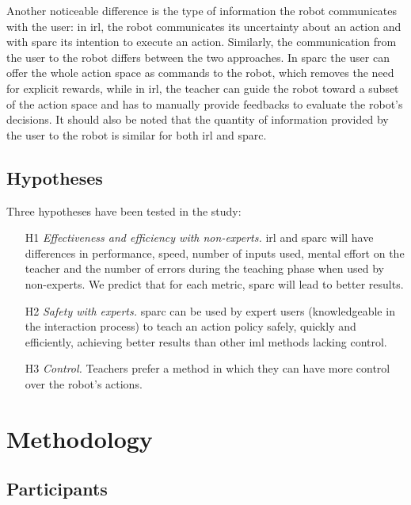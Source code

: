 Another noticeable difference is the type of information the robot communicates with the user: in \gls{irl}, the robot communicates its uncertainty about an action and with \gls{sparc} its intention to execute an action. Similarly, the communication from the user to the  robot differs between the two approaches. In \gls{sparc} the user can offer the whole action space as commands to the robot, which removes the need for explicit rewards, while in \gls{irl}, the teacher can guide the robot toward a subset of the action space and has to manually provide feedbacks to evaluate the robot's decisions. It should also be noted that the quantity of information provided by the user to the robot is similar for both \gls{irl} and \gls{sparc}. 

\subsection{Hypotheses}

Three hypotheses have been tested in the study:
\begin{enumerate}
	\item [H1] \textit{Effectiveness and efficiency with non-experts.} \gls{irl} and \gls{sparc} will have differences in performance, speed, number of inputs used, mental effort on the teacher and the number of errors during the teaching phase when used by non-experts. We predict that for each metric, \gls{sparc} will lead to better results.
	\item [H2] \textit{Safety with experts.} \gls{sparc} can be used by expert users (knowledgeable in the interaction process) to teach an action policy safely, quickly and efficiently, achieving better results than other \gls{iml} methods lacking control.
	\item [H3] \textit{Control.} Teachers prefer a method in which they can have more control over the robot's actions.
\end{enumerate}
\section{Methodology}
\subsection{Participants}

